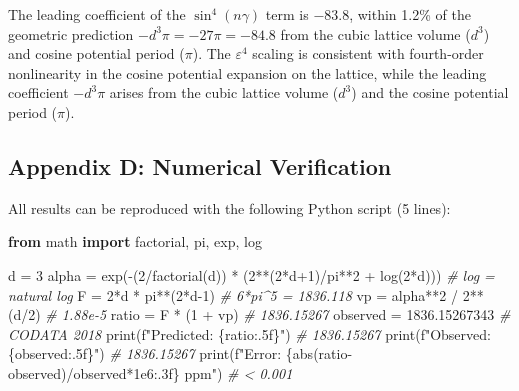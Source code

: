 \documentclass[
]{article}
\newenvironment{Shaded}{}{}
\newcommand{\BuiltInTok}[1]{\textcolor[rgb]{0.00,0.50,0.00}{#1}}
\newcommand{\CommentTok}[1]{\textcolor[rgb]{0.38,0.63,0.69}{\textit{#1}}}
\newcommand{\DecValTok}[1]{\textcolor[rgb]{0.25,0.63,0.44}{#1}}
\newcommand{\FloatTok}[1]{\textcolor[rgb]{0.25,0.63,0.44}{#1}}
\newcommand{\ImportTok}[1]{\textcolor[rgb]{0.00,0.50,0.00}{\textbf{#1}}}
\newcommand{\NormalTok}[1]{#1}
\newcommand{\OperatorTok}[1]{\textcolor[rgb]{0.40,0.40,0.40}{#1}}
\newcommand{\SpecialCharTok}[1]{\textcolor[rgb]{0.25,0.44,0.63}{#1}}
\newcommand{\SpecialStringTok}[1]{\textcolor[rgb]{0.73,0.40,0.53}{#1}}
\begin{document}
The leading coefficient of the \(\sin^4(n\gamma)\) term is \(-83.8\),
within 1.2\% of the geometric prediction \(-d^3\pi = -27\pi = -84.8\)
from the cubic lattice volume (\(d^3\)) and cosine potential period
(\(\pi\)). The \(\varepsilon^4\) scaling is consistent with fourth-order
nonlinearity in the cosine potential expansion on the lattice, while the
leading coefficient \(-d^3\pi\) arises from the cubic lattice volume
(\(d^3\)) and the cosine potential period (\(\pi\)).

\subsection{Appendix D: Numerical
Verification}\label{appendix-d-numerical-verification}

All results can be reproduced with the following Python script (5
lines):

\begin{Shaded}
\begin{Highlighting}[]
\ImportTok{from}\NormalTok{ math }\ImportTok{import}\NormalTok{ factorial, pi, exp, log}

\NormalTok{d }\OperatorTok{=} \DecValTok{3}
\NormalTok{alpha }\OperatorTok{=}\NormalTok{ exp(}\OperatorTok{{-}}\NormalTok{(}\DecValTok{2}\OperatorTok{/}\NormalTok{factorial(d)) }\OperatorTok{*}\NormalTok{ (}\DecValTok{2}\OperatorTok{**}\NormalTok{(}\DecValTok{2}\OperatorTok{*}\NormalTok{d}\OperatorTok{+}\DecValTok{1}\NormalTok{)}\OperatorTok{/}\NormalTok{pi}\OperatorTok{**}\DecValTok{2} \OperatorTok{+}\NormalTok{ log(}\DecValTok{2}\OperatorTok{*}\NormalTok{d)))  }\CommentTok{\# log = natural log}
\NormalTok{F }\OperatorTok{=} \DecValTok{2}\OperatorTok{*}\NormalTok{d }\OperatorTok{*}\NormalTok{ pi}\OperatorTok{**}\NormalTok{(}\DecValTok{2}\OperatorTok{*}\NormalTok{d}\OperatorTok{{-}}\DecValTok{1}\NormalTok{)                    }\CommentTok{\# 6*pi\^{}5 = 1836.118}
\NormalTok{vp }\OperatorTok{=}\NormalTok{ alpha}\OperatorTok{**}\DecValTok{2} \OperatorTok{/} \DecValTok{2}\OperatorTok{**}\NormalTok{(d}\OperatorTok{/}\DecValTok{2}\NormalTok{)                 }\CommentTok{\# 1.88e{-}5}
\NormalTok{ratio }\OperatorTok{=}\NormalTok{ F }\OperatorTok{*}\NormalTok{ (}\DecValTok{1} \OperatorTok{+}\NormalTok{ vp)                      }\CommentTok{\# 1836.15267}
\NormalTok{observed }\OperatorTok{=} \FloatTok{1836.15267343}                   \CommentTok{\# CODATA 2018}
\BuiltInTok{print}\NormalTok{(}\SpecialStringTok{f"Predicted: }\SpecialCharTok{\{}\NormalTok{ratio}\SpecialCharTok{:.5f\}}\SpecialStringTok{"}\NormalTok{)           }\CommentTok{\# 1836.15267}
\BuiltInTok{print}\NormalTok{(}\SpecialStringTok{f"Observed:  }\SpecialCharTok{\{}\NormalTok{observed}\SpecialCharTok{:.5f\}}\SpecialStringTok{"}\NormalTok{)        }\CommentTok{\# 1836.15267}
\BuiltInTok{print}\NormalTok{(}\SpecialStringTok{f"Error: }\SpecialCharTok{\{}\BuiltInTok{abs}\NormalTok{(ratio}\OperatorTok{{-}}\NormalTok{observed)}\OperatorTok{/}\NormalTok{observed}\OperatorTok{*}\FloatTok{1e6}\SpecialCharTok{:.3f\}}\SpecialStringTok{ ppm"}\NormalTok{)  }\CommentTok{\# \textless{} 0.001}
\end{Highlighting}
\end{Shaded}
\end{document}
